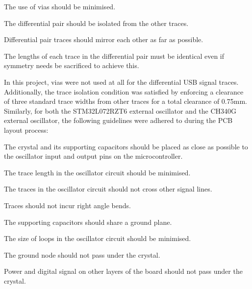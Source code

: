 \begin{compactitem}
	\item The use of vias should be minimised. 
	\item The differential pair should be isolated from the other traces. 
	\item Differential pair traces should mirror each other as far as possible.
	\item The lengths of each trace in the differential pair must be identical even if symmetry needs be sacrificed to achieve this.
\end{compactitem}


In this project, vias were not used at all for the differential USB signal traces. Additionally, the trace isolation condition was satisfied by enforcing a clearance of three standard trace widths from other traces for a total clearance of 0.75mm. Similarly, for both the STM32L072RZT6 external oscillator and the CH340G external oscillator, the following guidelines were adhered to during the PCB layout process:

\begin{compactitem}
	\item The crystal and its supporting capacitors should be placed as close as possible to the oscillator input and output pins on the microcontroller.
	\item The trace length in the oscillator circuit should be minimised.
	\item The traces in the oscillator circuit should not cross other signal lines.
	\item Traces should not incur right angle bends.
	\item The supporting capacitors should share a ground plane.
	\item The size of loops in the oscillator circuit should be minimised.
	\item The ground node should not pass under the crystal.
	\item Power and digital signal on other layers of the board should not pass under the crystal. 
\end{compactitem}

